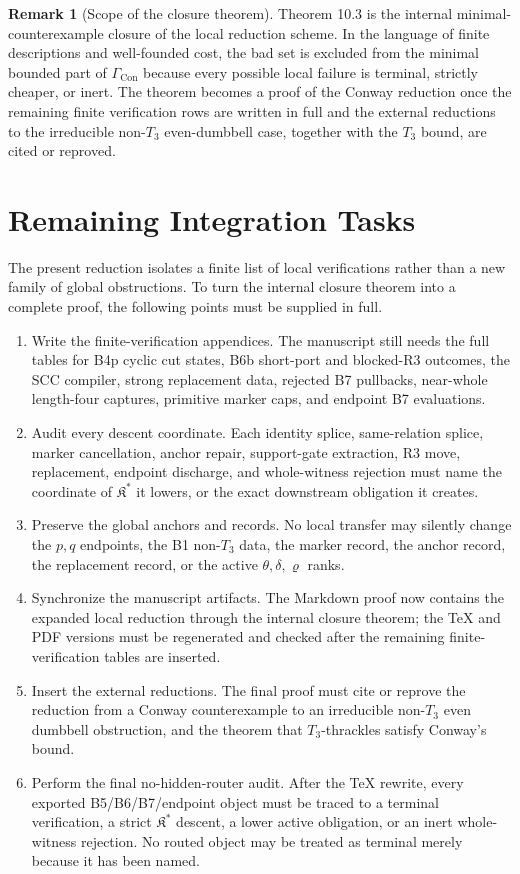 \documentclass[11pt]{amsart}
\theoremstyle{definition}
\newtheorem{remark}[theorem]{Remark}
\begin{document}
\begin{remark}[Scope of the closure theorem]
Theorem 10.3 is the internal
minimal-counterexample closure of the local reduction scheme. In the language
of finite descriptions and well-founded cost, the bad set is excluded from the
minimal bounded part of \(\Gamma_{\mathrm{Con}}\) because every possible local
failure is terminal, strictly cheaper, or inert. The theorem becomes a proof of
the Conway reduction once the remaining finite verification rows are written in
full and the external reductions to the irreducible non-\(T_3\) even-dumbbell
case, together with the \(T_3\) bound, are cited or reproved.

\end{remark}
\section{Remaining Integration Tasks}

The present reduction isolates a finite list of local verifications rather than
a new family of global obstructions. To turn the internal closure theorem into a
complete proof, the following points must be supplied in full.

\begin{enumerate}
\item Write the finite-verification appendices. The manuscript still needs the full
tables for B4p cyclic cut states, B6b short-port and blocked-R3 outcomes, the
SCC compiler, strong replacement data, rejected B7 pullbacks,
near-whole length-four captures, primitive marker caps, and endpoint B7
evaluations.
\item Audit every descent coordinate. Each identity splice, same-relation splice,
marker cancellation, anchor repair, support-gate extraction, R3 move,
replacement, endpoint discharge, and whole-witness rejection must name the
coordinate of \(\mathfrak K^\ast\) it lowers, or the exact downstream
obligation it creates.
\item Preserve the global anchors and records. No local transfer may silently
change the \(p,q\) endpoints, the B1 non-\(T_3\) data, the marker record,
the anchor record, the replacement record, or the active
\(\theta,\delta,\varrho\) ranks.
\item Synchronize the manuscript artifacts. The Markdown proof now contains the
expanded local reduction through the internal closure theorem; the TeX
and PDF versions must be regenerated and checked after the remaining
finite-verification tables are inserted.
\item Insert the external reductions. The final proof must cite or reprove the
reduction from a Conway counterexample to an irreducible non-\(T_3\) even
dumbbell obstruction, and the theorem that \(T_3\)-thrackles satisfy Conway's
bound.
\item Perform the final no-hidden-router audit. After the TeX rewrite, every
exported B5/B6/B7/endpoint object must be traced to a terminal verification, a
strict \(\mathfrak K^\ast\) descent, a lower active obligation, or an inert
whole-witness rejection. No routed object may be treated as terminal merely
because it has been named.
\end{enumerate}
\end{document}
